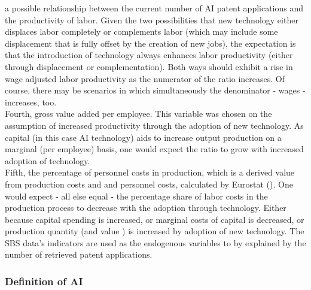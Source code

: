\documentclass[
  11,
  a4paperpaper,
]{article}
\begin{document}
a possible relationship between the current number of AI patent
applications and the productivity of labor. Given the two possibilities
that new technology either displaces labor completely or complements
labor (which may include some displacement that is fully offset by the
creation of new jobs), the expectation is that the introduction of
technology always enhances labor productivity (either through
displacement or complementation). Both ways should exhibit a rise in
wage adjusted labor productivity as the numerator of the ratio
increases. Of course, there may be scenarios in which simultaneously the
denominator - wages - increases, too.\\
Fourth, gross value added per employee. This variable was chosen on the
assumption of increased productivity through the adoption of new
technology. As capital (in this case AI technology) aids to increase
output production on a marginal (per employee) basis, one would expect
the ratio to grow with increased adoption of technology.\\
Fifth, the percentage of personnel costs in production, which is a
derived value from production costs and and personnel costs, calculated
by Eurostat
(). One would expect - all else equal -
the percentage share of labor costs in the production process to
decrease with the adoption through technology. Either because capital
spending is increased, or marginal costs of capital is decreased, or
production quantity (and value ) is increased by adoption of new
technology. The SBS data's indicators are used as the endogenous
variables to by explained by the number of retrieved patent
applications.

\subsubsection{Definition of AI}\label{definition-of-ai}
\end{document}
